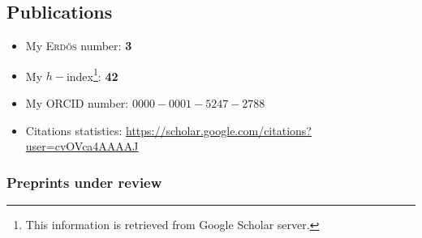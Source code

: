 \separator
\subsection{Publications}

\begin{itemize}
  \item[$\blacktriangleright$] My \textsc{Erd\H{o}s} number: \textbf{3}
  \item[$\blacktriangleright$] My $h-$index\footnote{This information is retrieved from Google Scholar server.}: \textbf{42}
  \item[$\blacktriangleright$] My ORCID number: $0000-0001-5247-2788$
  \item[$\blacktriangleright$] Citations statistics: \url{https://scholar.google.com/citations?user=cvOVca4AAAAJ}
\end{itemize}

\separator
\subsubsection{Preprints under review}

